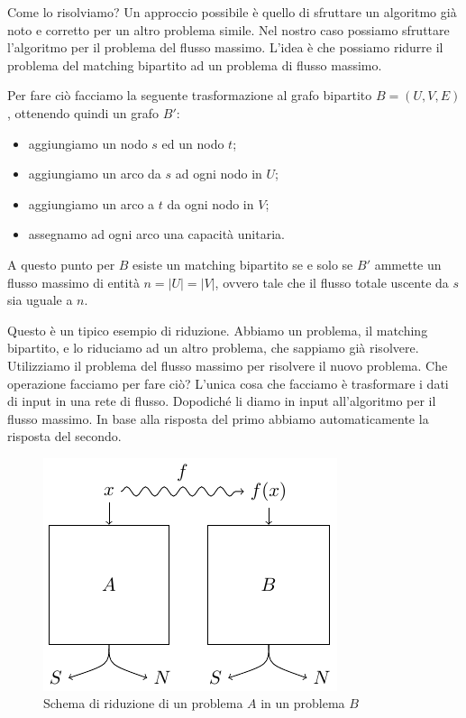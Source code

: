 Come lo risolviamo? Un approccio possibile è quello di sfruttare un algoritmo già noto e corretto
per un altro problema simile. Nel nostro caso possiamo sfruttare l'algoritmo per il problema del
flusso massimo. L'idea è che possiamo ridurre il problema del matching bipartito ad un problema di
flusso massimo.

Per fare ciò facciamo la seguente trasformazione al grafo bipartito $B = (U,V,E)$, ottenendo quindi un grafo
$B'$:
\begin{itemize}
    \item aggiungiamo un nodo $s$ ed un nodo $t$;
    \item aggiungiamo un arco da $s$ ad ogni nodo in $U$;
    \item aggiungiamo un arco a $t$ da ogni nodo in $V$;
    \item assegnamo ad ogni arco una capacità unitaria.
\end{itemize}

A questo punto per $B$ esiste un matching bipartito se e solo se $B'$ ammette un flusso massimo di
entità $n = |U| = |V|$, ovvero tale che il flusso totale uscente da $s$ sia uguale a $n$.

Questo è un tipico esempio di riduzione. Abbiamo un problema, il matching bipartito, e lo riduciamo
ad un altro problema, che sappiamo già risolvere. Utilizziamo il problema del flusso massimo per risolvere
il nuovo problema. Che operazione facciamo per fare ciò? L'unica cosa che facciamo è trasformare
i dati di input in una rete di flusso. Dopodiché li diamo in input all'algoritmo per il flusso
massimo. In base alla risposta del primo abbiamo automaticamente la risposta del secondo.

\begin{figure}[h]
    \begin{center}
        \includegraphics{./img/complexity_intro/Reducibility.pdf}
    \end{center}
    \caption{Schema di riduzione di un problema $A$ in un problema $B$}
\end{figure}

